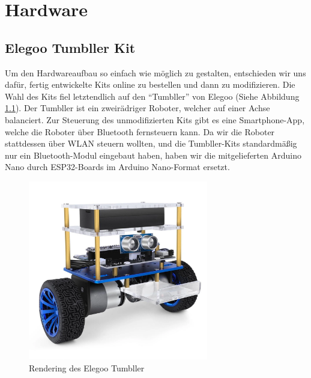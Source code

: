 \chapter{Hardware}
\label{sec:hardware}
\section{Elegoo Tumbller Kit}
\label{subsec:elegoo_tumbller}
Um den Hardwareaufbau so einfach wie möglich zu gestalten,
entschieden wir uns dafür,
fertig entwickelte Kits online zu bestellen und dann zu modifizieren.
%
Die Wahl des Kits fiel letztendlich auf den ``Tumbller'' von Elegoo (Siehe Abbildung \ref{fig:elegoo_tumbller}).
%
Der Tumbller ist ein zweirädriger Roboter, welcher auf einer Achse balanciert.
%
Zur Steuerung des unmodifizierten Kits gibt es eine Smartphone-App,
welche die Roboter über Bluetooth fernsteuern kann.
%
Da wir die Roboter stattdessen über WLAN steuern wollten, 
und die Tumbller-Kits standardmäßig nur ein Bluetooth-Modul eingebaut haben,
haben wir die mitgelieferten Arduino Nano durch ESP32-Boards im Arduino Nano-Format ersetzt.
\begin{figure}[H]
    \includegraphics[width=0.7\textwidth, center]{img/elegoo_tumbller.png}
    \caption{Rendering des Elegoo Tumbller}
    \label{fig:elegoo_tumbller}
\end{figure}

